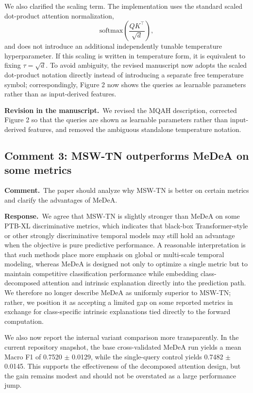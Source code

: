 \documentclass[11pt]{article}
\newcommand{\commentheader}{\textbf{Comment.}}
\newcommand{\responseheader}{\textbf{Response.}}
\newcommand{\revisionheader}{\textbf{Revision in the manuscript.}}
\begin{document}
We also clarified the scaling term. The implementation uses the standard scaled dot-product attention normalization,
\[
\mathrm{softmax}\!\left(\frac{QK^\top}{\sqrt{d}}\right),
\]
and does not introduce an additional independently tunable temperature hyperparameter. If this scaling is written in temperature form, it is equivalent to fixing $\tau=\sqrt{d}$. To avoid ambiguity, the revised manuscript now adopts the scaled dot-product notation directly instead of introducing a separate free temperature symbol; correspondingly, Figure 2 now shows the queries as learnable parameters rather than as input-derived features.

\revisionheader\ We revised the MQAH description, corrected Figure 2 so that the queries are shown as learnable parameters rather than input-derived features, and removed the ambiguous standalone temperature notation.

\subsection*{Comment 3: MSW-TN outperforms MeDeA on some metrics}

\commentheader\ The paper should analyze why MSW-TN is better on certain metrics and clarify the advantages of MeDeA.

\responseheader\ We agree that MSW-TN is slightly stronger than MeDeA on some PTB-XL discriminative metrics, which indicates that black-box Transformer-style or other strongly discriminative temporal models may still hold an advantage when the objective is pure predictive performance. A reasonable interpretation is that such methods place more emphasis on global or multi-scale temporal modeling, whereas MeDeA is designed not only to optimize a single metric but to maintain competitive classification performance while embedding class-decomposed attention and intrinsic explanation directly into the prediction path. We therefore no longer describe MeDeA as uniformly superior to MSW-TN; rather, we position it as accepting a limited gap on some reported metrics in exchange for class-specific intrinsic explanations tied directly to the forward computation.

We also now report the internal variant comparison more transparently. In the current repository snapshot, the base cross-validated MeDeA run yields a mean Macro F1 of 0.7520 $\pm$ 0.0129, while the single-query control yields 0.7482 $\pm$ 0.0145. This supports the effectiveness of the decomposed attention design, but the gain remains modest and should not be overstated as a large performance jump.
\end{document}
